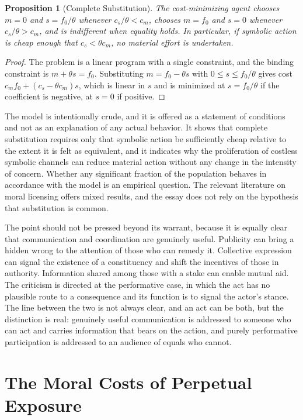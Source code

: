 \documentclass[11pt]{report}
\newtheorem{proposition}[theorem]{Proposition}
\theoremstyle{definition}
\theoremstyle{remark}
\begin{document}
\begin{proposition}[Complete Substitution]\label{prop:substitute}
The cost-minimizing agent chooses $m=0$ and $s=f_0/\theta$ whenever $c_s/\theta<c_m$, chooses $m=f_0$ and $s=0$ whenever $c_s/\theta>c_m$, and is indifferent when equality holds. In particular, if symbolic action is cheap enough that $c_s<\theta c_m$, no material effort is undertaken.
\end{proposition}

\begin{proof}
The problem is a linear program with a single constraint, and the binding constraint is $m+\theta s=f_0$. Substituting $m=f_0-\theta s$ with $0\le s\le f_0/\theta$ gives cost $c_mf_0+(c_s-\theta c_m)s$, which is linear in $s$ and is minimized at $s=f_0/\theta$ if the coefficient is negative, at $s=0$ if positive.
\end{proof}

The model is intentionally crude, and it is offered as a statement of conditions and not as an explanation of any actual behavior. It shows that complete substitution requires only that symbolic action be sufficiently cheap relative to the extent it is felt as equivalent, and it indicates why the proliferation of costless symbolic channels can reduce material action without any change in the intensity of concern. Whether any significant fraction of the population behaves in accordance with the model is an empirical question. The relevant literature on moral licensing offers mixed results, and the essay does not rely on the hypothesis that substitution is common.

The point should not be pressed beyond its warrant, because it is equally clear that communication and coordination are genuinely useful. Publicity can bring a hidden wrong to the attention of those who can remedy it. Collective expression can signal the existence of a constituency and shift the incentives of those in authority. Information shared among those with a stake can enable mutual aid. The criticism is directed at the performative case, in which the act has no plausible route to a consequence and its function is to signal the actor's stance. The line between the two is not always clear, and an act can be both, but the distinction is real: genuinely useful communication is addressed to someone who can act and carries information that bears on the action, and purely performative participation is addressed to an audience of equals who cannot.

\section{The Moral Costs of Perpetual Exposure}
\end{document}
